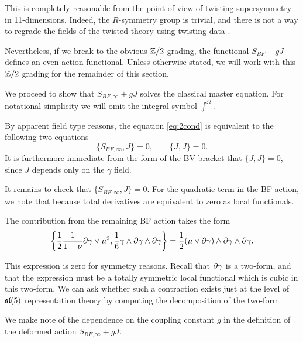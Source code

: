 This is completely reasonable from the point of view of twisting supersymmetry in 11-dimensions. 
Indeed, the $R$-symmetry group is trivial, and there is not a way to regrade the fields of the twisted theory using twisting data \label{CosHol,ESW}. 

Nevertheless, if we break to the obvious $\mathbb Z/2$ grading, the functional $S_{BF} + g J$ defines an even action functional.
Unless otherwise stated, we will work with this $\mathbb Z/2$ grading for the remainder of this section.

\parsec[]
We proceed to show that $S_{BF,\infty} + g J$ solves the classical master equation.
For notational simplicity we will omit the integral symbol $\int^\Omega$.

By apparent field type reasons, the equation \eqref{eq:2cond} is equivalent to the following two equations
\[
\{S_{BF,\infty}, J\} = 0, \qquad \{J,J\} = 0.
\] 
It is furthermore immediate from the form of the BV bracket that $\{J,J\} = 0$, since $J$ depends only on the $\gamma$ field. 

It remains to check that $\{S_{BF,\infty},J\} = 0$. 
For the quadratic term in the BF action, we note that 
  because total derivatives are equivalent to zero as local functionals. 
  
The contribution from the remaining BF action takes the form
\[
    \left\{ \frac12 \frac{1}{1-\nu} \partial\gamma \vee \mu^2, \frac16 \gamma \wedge \partial\gamma \wedge \partial \gamma \right\} =\frac12 (\mu \vee \partial \gamma) \wedge \partial \gamma \wedge \partial \gamma .
\]


This expression is zero for symmetry reasons. 
Recall that $\partial\gamma$ is a two-form, and that the expression must be a totally symmetric local functional which is cubic in this two-form. We can ask whether such a  contraction exists just at the level of $\mathfrak{sl}(5)$ representation theory by computing the decomposition of the two-form  

\parsec[s:coupling]

We make note of the dependence on the coupling constant $g$ in the definition of the deformed action $S_{BF,\infty} + g J$. 

